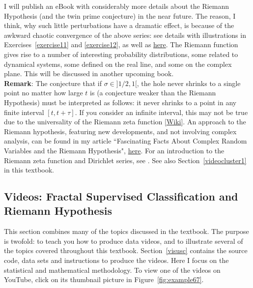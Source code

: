 \documentclass[10pt]{article}
\begin{document}
I will publish an eBook with considerably more details about the Riemann Hypothesis (and the twin prime conjecture) in the near future. The reason, I think, why such little perturbations have a dramatic effect, is because of the awkward \textcolor{index}{chaotic convergence} of the above series: see details with illustrations in Exercises~\ref{exercise11} and \ref{exercise12}, as well as \href{https://mathoverflow.net/questions/379650/more-mysteries-about-the-zeros-of-the-riemann-zeta-function}{here}. The Riemann function gives rise to a number of interesting probability distributions, some related to dynamical systems, some defined on the real line, and some on the complex plane. This will be discussed in another upcoming book.  \vspace{1ex} \\
{\bf Remark}: The conjecture that if $\sigma\in]1/2,1[$, the hole never shrinks to a single point no matter how large $t$ is (a conjecture weaker than the Riemann Hypothesis) must be interpreted as follows: it never shrinks to a point in any finite interval $[t,t+\tau]$. 
If you consider an infinite interval, this may not be true due to the universality of the Riemann 
zeta function [\href{https://en.wikipedia.org/wiki/Zeta_function_universality}{Wiki}]. An approach to the Riemann hypothesis, featuring new developments, and not involving complex analysis, can be found in my article ``Fascinating Facts About Complex Random Variables and the Riemann Hypothesis", \href{https://www.vgranville.com/2022/02/fascinating-facts-about-complex-random.html}{here}. For an introduction to the Riemann zeta function and Dirichlet series, see \cite{ivic}. See also Section~\ref{videocluster1} in this textbook.

\subsection{Videos: Fractal Supervised Classification and Riemann Hypothesis}\label{videocluster}

This section combines many of the topics discussed in the textbook. The purpose is twofold: to teach you how to produce data videos, and to illustrate several of the topics covered throughout this textbook. Section~\ref{visusc} contains the source code, data sets and instructions to produce the videos. Here I focus on the statistical and mathematical methodology. To view one of the videos on YouTube, click on its thumbnail picture in Figure~\ref{fig:example67}.  
\end{document}
